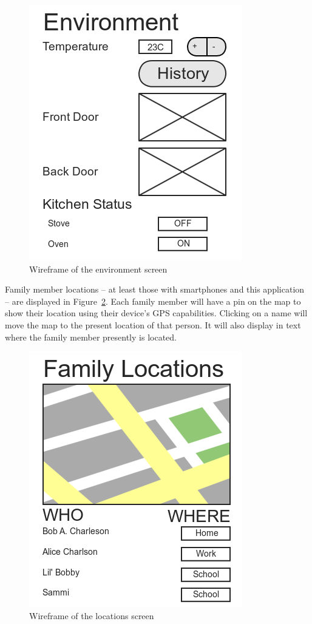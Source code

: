 \documentclass{report}
\begin{document}
\begin{figure}[H]
    \centering
    \includegraphics[scale=0.5]{mock_environment}
    \caption[Wireframe of the environment screen]
            {Wireframe of the environment screen}
    \label{fig:wireframe-environment}
\end{figure}

Family member locations -- at least those with smartphones and this
application -- are displayed in Figure~\ref{fig:wireframe-locations}. Each family
member will have a pin on the map to show their location using their device's
GPS capabilities. Clicking on a name will move the map to the present location
of that person. It will also display in text where the family member presently
is located.

\begin{figure}[H]
    \centering
    \includegraphics[scale=0.5]{mock_locations}
    \caption[Wireframe of the locations screen]
            {Wireframe of the locations screen}
    \label{fig:wireframe-locations}
\end{figure}
\end{document}
